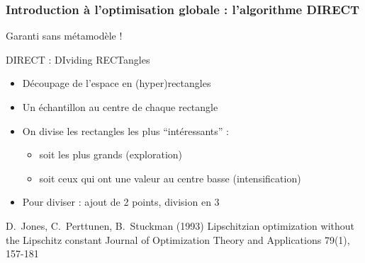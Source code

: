 \begin{frame}
  \frametitle{Introduction à l'optimisation globale : l'algorithme DIRECT}
  Garanti sans métamodèle !
  \begin{block}{DIRECT : DIviding RECTangles}
  \begin{itemize}
   \item Découpage de l'espace en (hyper)rectangles
   \item Un échantillon au centre de chaque rectangle
   \item On divise les rectangles les plus ``intéressants'' :
   \begin{itemize}
     \item soit les plus grands (exploration)
     \item soit ceux qui ont une valeur au centre basse (intensification)
   \end{itemize}
   \item Pour diviser : ajout de 2 points, division en 3
  \end{itemize}
  \end{block}
  \scriptsize{
 \begin{thebibliography}{7}
\beamertemplatearticlebibitems
     D.~Jones, C.~Perttunen, B.~Stuckman (1993)
         \newblock Lipschitzian optimization without the Lipschitz constant
         \newblock Journal of Optimization Theory and Applications 79(1), 157-181
 \end{thebibliography}
}
\normalsize
%   
\end{frame}
